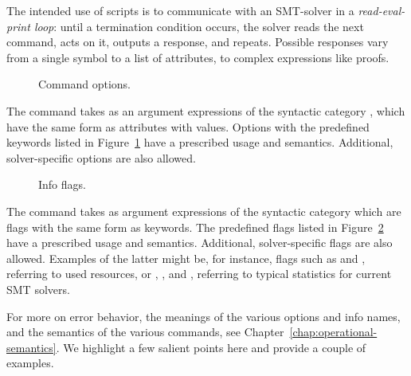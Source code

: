 The intended use of scripts is to communicate with an SMT-solver 
in a \emph{read-eval-print loop}: until a termination condition occurs, 
the solver reads the next command, acts on it, outputs a response, and repeats.
Possible responses vary from a single symbol to a list of attributes, 
to complex expressions like proofs.


\begin{figure}
\small
\cCommandOptions
\caption{Command options.}
\label{fig:command-options}
\end{figure}

The command  takes as an argument expressions 
of the syntactic category , which have the same form 
as attributes with values.
Options with the predefined keywords listed in Figure~\ref{fig:command-options} 
have a prescribed usage and semantics.
Additional, solver-specific options are also allowed.


\begin{figure}
\small
\cInfoFlags
\caption{Info flags.}
\label{fig:info-flags}
\end{figure}

The command  takes as argument 
expressions of the syntactic category 
which are flags with the same form as keywords.
The predefined flags listed in Figure~\ref{fig:info-flags} have 
a prescribed usage and semantics.
Additional, solver-specific flags are also allowed.
Examples of the latter might be, for instance, flags such as
 and , referring to used resources, or  
, , and ,
referring to typical statistics for current SMT solvers. 

For more on error behavior, the meanings of the various options and info names,
and the semantics of the various commands, 
see Chapter~\ref{chap:operational-semantics}.
We highlight a few salient points here and provide a couple of examples.


